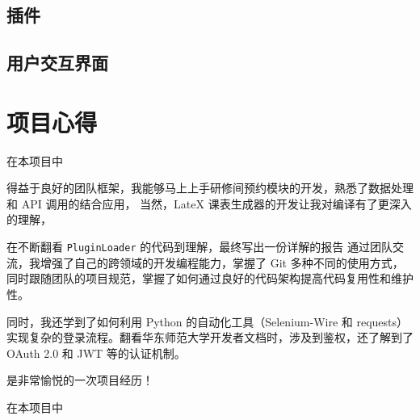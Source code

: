 \documentclass[14pt,a4paper,UTF8,twoside]{article}
\begin{document}
    \subsection{插件}\label{subsec:plugins}
    
    
    

    \subsection{用户交互界面}\label{subsec:gui}
    

    \section{项目心得}\label{sec:thoughts}

    \begin{Thought}[关卓谦]
        在本项目中
    \end{Thought}

    \begin{Thought}[张梓卫]
        得益于良好的团队框架，我能够马上上手研修间预约模块的开发，熟悉了数据处理和 API 调用的结合应用，
        当然，LateX 课表生成器的开发让我对编译有了更深入的理解，

        \vspace{0.3cm}

        在不断翻看 \verb`PluginLoader` 的代码到理解，最终写出一份详解的报告
        通过团队交流，我增强了自己的跨领域的开发编程能力，掌握了 Git 多种不同的使用方式，
        同时跟随团队的项目规范，掌握了如何通过良好的代码架构提高代码复用性和维护性。

        \vspace{0.3cm}

        同时，我还学到了如何利用 Python 的自动化工具（Selenium-Wire 和 requests）
        实现复杂的登录流程。翻看华东师范大学开发者文档时，涉及到鉴权，还了解到了 OAuth 2.0 和 JWT 等的认证机制。

        \vspace{0.3cm}

        是非常愉悦的一次项目经历！
    \end{Thought}

    \begin{Thought}[王文锦]
        在本项目中
    \end{Thought}
\end{document}
